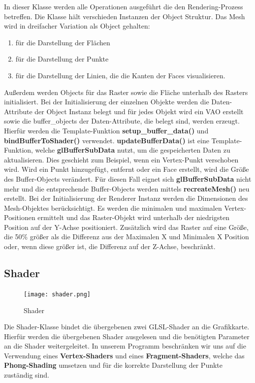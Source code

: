 \noindent In dieser Klasse werden alle Operationen ausgeführt die den Rendering-Prozess betreffen. Die Klasse hält verschieden Instanzen der Object Struktur. Das Mesh wird in dreifacher Variation als Object gehalten:
\begin{enumerate}
\item für die Darstellung der Flächen
\item für die Darstellung der Punkte
\item für die Darstellung der Linien, die die Kanten der Faces visualisieren.
\end{enumerate}
Außerdem werden Objects für das Raster sowie die Fläche unterhalb des Rasters initialisiert.\newline
Bei der Initialisierung der einzelnen Objekte werden die Daten-Attribute der Object Instanz belegt und für jedes Objekt wird ein VAO erstellt sowie die buffer\_objects der Daten-Attribute, die belegt sind, werden erzeugt. Hierfür werden die Template-Funktion \textbf{setup\_buffer\_data()} und \textbf{bindBufferToShader()} verwendet. \textbf{updateBufferData()} ist eine Template-Funktion, welche \textbf{glBufferSubData} nutzt, um die gespeicherten Daten zu aktualisieren. Dies geschieht zum Beispiel, wenn ein Vertex-Punkt verschoben wird. Wird ein Punkt hinzugefügt, entfernt oder ein Face erstellt, wird die Größe des Buffer-Objects verändert. Für diesen Fall eignet sich \textbf{glBufferSubData} nicht mehr und die entsprechende Buffer-Objects werden mittels \textbf{recreateMesh()} neu erstellt.\newline
Bei der Initialisierung der Renderer Instanz werden die Dimensionen des Mesh-Objektes berücksichtigt. Es werden die minimalen und maximalen Vertex-Positionen ermittelt und das Raster-Objekt wird unterhalb der niedrigsten Position auf der Y-Achse positioniert. Zusätzlich wird das Raster auf eine Größe, die 50\% größer als die Differenz aus der Maximalen X und Minimalen X Position oder, wenn diese größer ist, die Differenz auf der Z-Achse, beschränkt.

\subsection{Shader}

\begin{figure}[H]
\centering
\texttt{[image: shader.png]}
\caption{Shader}
\label{fig7}
\end{figure}

\noindent Die Shader-Klasse bindet die übergebenen zwei GLSL-Shader an die Grafikkarte. Hierfür werden die übergebenen Shader ausgelesen und die benötigten Parameter an die Shader weitergeleitet. In unserem Programm beschränken wir uns auf die Verwendung eines \textbf{Vertex-Shaders} und eines \textbf{Fragment-Shaders}, welche das \textbf{Phong-Shading} umsetzen und für die korrekte Darstellung der Punkte zuständig sind.

